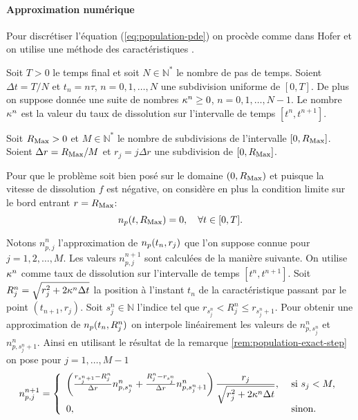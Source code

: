 \paragraph{Approximation numérique} Pour discrétiser l'équation
(\ref{eq:population-pde}) on procède comme dans Hofer \cite{Hofer2011}
et on utilise une méthode des caractéristiques \cite{Pironneau1989}.

Soit $T > 0$ le temps final et soit $N\in \mathbb N^*$ le nombre de
pas de temps. Soient $\Delta t = T/N$ et $t_n = n\tau$, $n = 0,1,
\dots, N$ une subdivision uniforme de $[0, T]$. De plus on suppose
donnée une suite de nombres $\kappa^n \geq 0$, $n = 0, 1,
\dots, N - 1$. Le nombre $\kappa^n$ est la valeur du taux de
dissolution sur l'intervalle de temps $[t^n, t^{n+1}]$.

Soit $R_\mathrm{Max} > 0$ et $M \in \mathbb N^*$ le nombre de subdivisions de
l'intervalle $[0, R_\mathrm{Max}]$. Soient $\Delta r = R_\mathrm{Max}/M$ et $r_j =
j\Delta r$ une subdivision de $[0, R_\mathrm{Max}]$.

Pour que le problème soit bien posé sur le domaine $(0,
R_\mathrm{Max})$ et puisque la vitesse de dissolution $f$ est négative, on
considère en plus la condition limite sur le bord entrant $r = R_\mathrm{Max}$:
\begin{equation*}
  n_p(t, R_\mathrm{Max}) = 0,\quad\forall t \in [0, T].
\end{equation*}

Notons $n_{p,j}^n$ l'approximation de $n_p(t_n, r_j)$ que l'on
suppose connue pour $j = 1,2, \dots, M$. Les valeurs $n_{p,j}^{n+1}$
sont calculées de la manière suivante. On utilise $\kappa^n$
comme taux de dissolution sur l'intervalle de temps $[t^n,
  t^{n+1}]$. Soit $R_j^n = \sqrt{r_j^2 + 2\kappa^n \Delta
  t}$ la position à l'instant $t_n$ de la caractéristique passant par le point
$(t_{n+1}, r_j)$. Soit $s_j^n \in \mathbb N$
l'indice tel que $r_{s_j^n} < R_j^n \leq r_{s_j^n + 1}$. Pour obtenir
une approximation de $n_p(t_n, R_j^n)$ on interpole
linéairement les valeurs de $n_{p,s_j^n}^n$ et
$n_{p,s_j^n+1}^n$. Ainsi en
utilisant le résultat de la remarque \ref{rem:population-exact-step}
on pose pour $j = 1,\dots, M-1$
\begin{equation}\label{eq:population-characteristic-scheme}
  n_{p,j}^{n+1} = \left\{
  \begin{array}{ll}
    \left( \frac{r_{s_j^n + 1} - R_j^n}{\Delta r}
      n_{p,s_j^n}^n + \frac{R_j^n - r_{s_j^n}}{\Delta r} n_{p,s_j^n +
        1}^n \right) \displaystyle\frac{r_j}{\sqrt{r_j^2 + 2\kappa^n \Delta
        t}},&\text{ si } s_j < M,\\
    0, & \text{ sinon.}
  \end{array}
  \right.
\end{equation}


